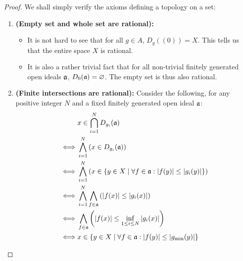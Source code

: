                         \begin{proof}
                            We shall simply verify the axioms defining a topology on a set:
                                \begin{enumerate}
                                    \item \textbf{(Empty set and whole set are rational):} 
                                        \begin{itemize}
                                            \item It is not hard to see that for all $g \in A$, $D_g((0)) = X$. This tells us that the entire space $X$ is rational.
                                            \item It is also a rather trivial fact that for all non-trivial finitely generated open ideals $\a$, $D_0(\a) = \varnothing$. The empty set is thus also rational.
                                        \end{itemize}
                                    \item \textbf{(Finite intersections are rational):} Consider the following, for any positive integer $N$ and a fixed finitely generated open ideal $\a$:
                                        $$
                                            \begin{aligned}
                                                & x \in \bigcap_{i = 1}^N D_{g_i}(\a)
                                                \\
                                                \iff & \bigwedge_{i = 1}^N \left(x \in D_{g_i}(\a)\right)
                                                \\
                                                \iff & \bigwedge_{i = 1}^N \left(x \in \{y \in X \mid \forall f \in \a: |f(y)| \leq |g_i(y)|\}\right)
                                                \\
                                                \iff & \bigwedge_{i = 1}^N \bigwedge_{f \in \a} \left(|f(x)| \leq |g_i(x)|\right)
                                                \\
                                                \iff & \bigwedge_{f \in \a} \left(|f(x)| \leq \inf_{1 \leq i \leq N} |g_i(x)|\right)
                                                \\
                                                \iff & x \in \left\{y \in X \mid \forall f \in \a: |f(y)| \leq |g_{\min}(y)|\right\}
                                                \\

\end{aligned}$$
\end{enumerate}
\end{proof}
